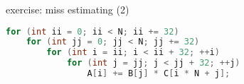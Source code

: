 \begin{frame}[fragile,label=missEstExer2]{exercise: miss estimating (2)}
\begin{lstlisting}[language=C++,style=small]
for (int ii = 0; ii < N; ii += 32)
    for (int jj = 0; jj < N; jj += 32)
        for (int i = ii; i < ii + 32; ++i)
            for (int j = jj; j < jj + 32; ++j)
                A[i] += B[j] * C[i * N + j];
\end{lstlisting}
\begin{itemize}
\end{itemize}
\end{frame}
